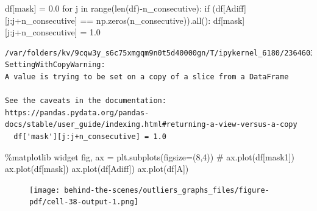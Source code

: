 \documentclass[
  letterpaper,
  DIV=11,
  numbers=noendperiod,
  oneside]{scrreprt}
\newenvironment{Shaded}{\begin{snugshade}}{\end{snugshade}}
\newcommand{\BuiltInTok}[1]{\textcolor[rgb]{0.00,0.23,0.31}{#1}}
\newcommand{\CommentTok}[1]{\textcolor[rgb]{0.37,0.37,0.37}{#1}}
\newcommand{\ControlFlowTok}[1]{\textcolor[rgb]{0.00,0.23,0.31}{#1}}
\newcommand{\DecValTok}[1]{\textcolor[rgb]{0.68,0.00,0.00}{#1}}
\newcommand{\FloatTok}[1]{\textcolor[rgb]{0.68,0.00,0.00}{#1}}
\newcommand{\KeywordTok}[1]{\textcolor[rgb]{0.00,0.23,0.31}{#1}}
\newcommand{\NormalTok}[1]{\textcolor[rgb]{0.00,0.23,0.31}{#1}}
\newcommand{\OperatorTok}[1]{\textcolor[rgb]{0.37,0.37,0.37}{#1}}
\newcommand{\StringTok}[1]{\textcolor[rgb]{0.13,0.47,0.30}{#1}}
\begin{document}
\begin{Shaded}
\begin{Highlighting}[]
\NormalTok{df[}\StringTok{\textquotesingle{}mask\textquotesingle{}}\NormalTok{] }\OperatorTok{=} \FloatTok{0.0}
\ControlFlowTok{for}\NormalTok{ j }\KeywordTok{in} \BuiltInTok{range}\NormalTok{(}\BuiltInTok{len}\NormalTok{(df)}\OperatorTok{{-}}\NormalTok{n\_consecutive):}
    \ControlFlowTok{if}\NormalTok{ (df[}\StringTok{\textquotesingle{}Adiff\textquotesingle{}}\NormalTok{][j:j}\OperatorTok{+}\NormalTok{n\_consecutive] }\OperatorTok{==}\NormalTok{ np.zeros(n\_consecutive)).}\BuiltInTok{all}\NormalTok{():}
\NormalTok{        df[}\StringTok{\textquotesingle{}mask\textquotesingle{}}\NormalTok{][j:j}\OperatorTok{+}\NormalTok{n\_consecutive] }\OperatorTok{=} \FloatTok{1.0}
\end{Highlighting}
\end{Shaded}

\begin{verbatim}
/var/folders/kv/9cqw3y_s6c75xmgqm9n0t5d40000gn/T/ipykernel_6180/2364603426.py:4: SettingWithCopyWarning: 
A value is trying to be set on a copy of a slice from a DataFrame

See the caveats in the documentation: https://pandas.pydata.org/pandas-docs/stable/user_guide/indexing.html#returning-a-view-versus-a-copy
  df['mask'][j:j+n_consecutive] = 1.0
\end{verbatim}

\begin{Shaded}
\begin{Highlighting}[]
\OperatorTok{\%}\NormalTok{matplotlib widget}
\NormalTok{fig, ax }\OperatorTok{=}\NormalTok{ plt.subplots(figsize}\OperatorTok{=}\NormalTok{(}\DecValTok{8}\NormalTok{,}\DecValTok{4}\NormalTok{))}
\CommentTok{\# ax.plot(df[\textquotesingle{}mask1\textquotesingle{}])}
\NormalTok{ax.plot(df[}\StringTok{\textquotesingle{}mask\textquotesingle{}}\NormalTok{])}
\NormalTok{ax.plot(df[}\StringTok{\textquotesingle{}Adiff\textquotesingle{}}\NormalTok{])}
\NormalTok{ax.plot(df[}\StringTok{\textquotesingle{}A\textquotesingle{}}\NormalTok{])}
\end{Highlighting}
\end{Shaded}

\begin{figure}[H]

{\centering \texttt{[image: behind-the-scenes/outliers\_graphs\_files/figure-pdf/cell-38-output-1.png]}

}

\end{figure}
\end{document}
